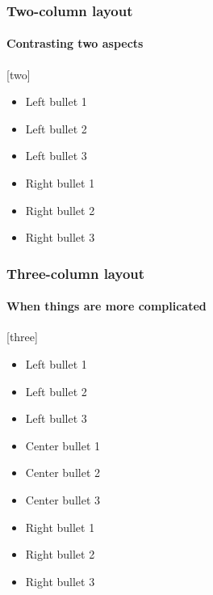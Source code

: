 \begin{frame}
    \frametitle{Two-column layout}
    \framesubtitle{Contrasting two aspects}

    [two]
    {
        \begin{itemize}
            \item Left bullet 1
            \item Left bullet 2
            \item Left bullet 3
        \end{itemize}
    }{
        \begin{itemize}
            \item Right bullet 1
            \item Right bullet 2
            \item Right bullet 3
        \end{itemize}
    }
\end{frame}

\begin{frame}
    \frametitle{Three-column layout}
    \framesubtitle{When things are more complicated}

    [three]
    {
        \begin{itemize}
            \item Left bullet 1
            \item Left bullet 2
            \item Left bullet 3
        \end{itemize}
    }
    {
        \begin{itemize}
            \item Center bullet 1
            \item Center bullet 2
            \item Center bullet 3
        \end{itemize}
    }{
        \begin{itemize}
            \item Right bullet 1
            \item Right bullet 2
            \item Right bullet 3
        \end{itemize}
    }
\end{frame}